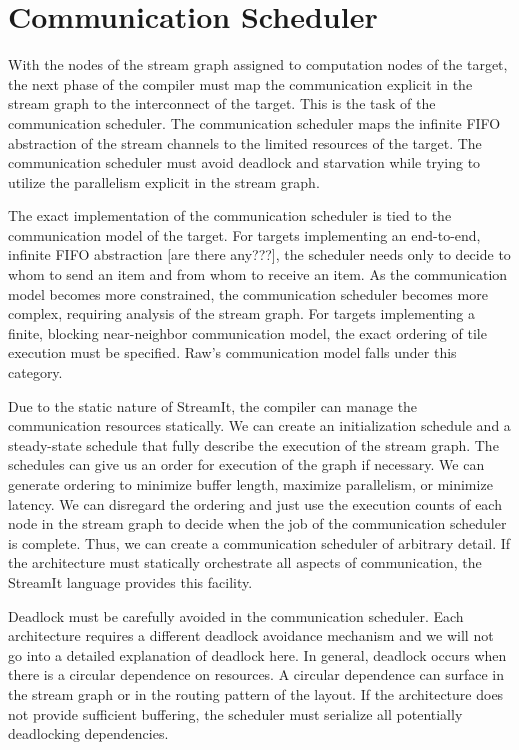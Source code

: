 \section{Communication Scheduler}
\label{sec:communic}

With the nodes of the stream graph assigned to computation nodes of
the target, the next phase of the compiler must map the communication
explicit in the stream graph to the interconnect of the target.  This
is the task of the communication scheduler.  The communication
scheduler maps the infinite FIFO abstraction of the stream channels to
the limited resources of the target.  The communication scheduler must
avoid deadlock and starvation while trying to utilize the parallelism
explicit in the stream graph.

The exact implementation of the communication scheduler is tied to the
communication model of the target.  For targets implementing an
end-to-end, infinite FIFO abstraction [are there any???], the
scheduler needs only to decide to whom to send an item and from whom
to receive an item.  As the communication model becomes more
constrained, the communication scheduler becomes more complex,
requiring analysis of the stream graph. For targets implementing a
finite, blocking near-neighbor communication model, the exact ordering
of tile execution must be specified.  Raw's communication model falls
under this category.

Due to the static nature of StreamIt, the compiler can manage the
communication resources statically.  We can create an initialization
schedule and a steady-state schedule that fully describe the execution
of the stream graph.  The schedules can give us an order for execution
of the graph if necessary.  We can generate ordering to minimize
buffer length, maximize parallelism, or minimize latency.  We can
disregard the ordering and just use the execution counts of each node
in the stream graph to decide when the job of the communication
scheduler is complete.  Thus, we can create a communication scheduler
of arbitrary detail.  If the architecture must statically orchestrate
all aspects of communication, the StreamIt language provides this
facility.

Deadlock must be carefully avoided in the communication
scheduler. Each architecture requires a different deadlock avoidance
mechanism and we will not go into a detailed explanation of deadlock
here.  In general, deadlock occurs when there is a circular dependence
on resources.  A circular dependence can surface in the stream graph
or in the routing pattern of the layout.  If the architecture does not
provide sufficient buffering, the scheduler must serialize all
potentially deadlocking dependencies.

